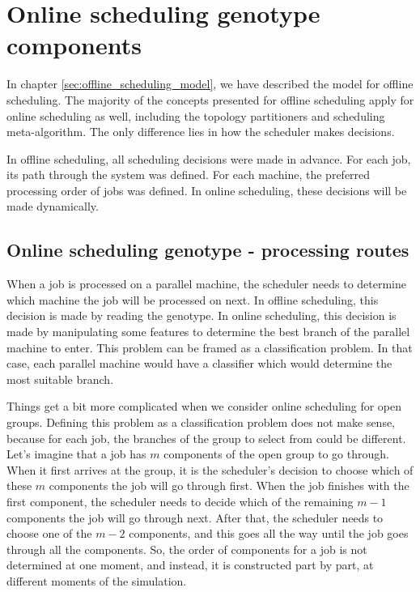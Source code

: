 \section{Online scheduling genotype components}
\label{sec:online_scheduling_genotype_components}

In chapter \ref{sec:offline_scheduling_model}, we have described the model for offline scheduling. The majority of the concepts presented for offline scheduling apply for online scheduling as well, including the topology partitioners and scheduling meta-algorithm. The only difference lies in how the scheduler makes decisions.

In offline scheduling, all scheduling decisions were made in advance. For each job, its path through the system was defined. For each machine, the preferred processing order of jobs was defined. In online scheduling, these decisions will be made dynamically.

\subsection{Online scheduling genotype - processing routes}

When a job is processed on a parallel machine, the scheduler needs to determine which machine the job will be processed on next. In offline scheduling, this decision is made by reading the genotype. In online scheduling, this decision is made by manipulating some features to determine the best branch of the parallel machine to enter. This problem can be framed as a classification problem. In that case, each parallel machine would have a classifier which would determine the most suitable branch.

Things get a bit more complicated when we consider online scheduling for open groups. Defining this problem as a classification problem does not make sense, because for each job, the branches of the group to select from could be different. Let's imagine that a job has $m$ components of the open group to go through. When it first arrives at the group, it is the scheduler's decision to choose which of these $m$ components the job will go through first. When the job finishes with the first component, the scheduler needs to decide which of the remaining $m-1$ components the job will go through next. After that, the scheduler needs to choose one of the $m-2$ components, and this goes all the way until the job goes through all the components. So, the order of components for a job is not determined at one moment, and instead, it is constructed part by part, at different moments of the simulation.


